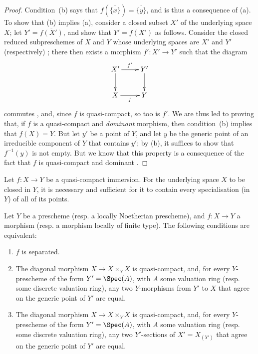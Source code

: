 \begin{proof}
Condition~(b) says that $f(\overline{\{x\}})=\overline{\{y\}}$, and is thus a consequence of (a).
To show that (b) implies (a), consider a closed subset $X'$ of the underlying space $X$;
let $Y'=\overline{f(X')}$, and show that $Y'=f(X')$ as follows.
Consider the closed reduced subpreschemes of $X$ and $Y$ whose underlying spaces are $X'$ and $Y'$ (respectively) ;
there then exists a morphism $f':X'\to Y'$ such that the diagram
\[
    \xymatrix{
        X' \ar[r]^{f'} \ar[d]
        & Y' \ar[d]
    \\  X \ar[r]_{f}
        & Y
    }
\]
commutes , and, since $f$ is quasi-compact, so too is $f'$.
We are thus led to proving that, if $f$ is a quasi-compact and \emph{dominant} morphism, then
condition~(b) implies that $f(X)=Y$.
But let $y'$ be a point of $Y$, and let $y$ be the generic point of an irreducible component of $Y$ that contains $y'$;
by (b), it suffices to show that $f^{-1}(y)$ is not empty.
But we know that this property is a consequence of the fact that $f$ is quasi-compact and dominant .
\end{proof}

\begin{corollary}[7.2.2]
\label{II.7.2.2}
Let $f:X\to Y$ be a quasi-compact immersion.
For the underlying space $X$ to be closed in $Y$, it is necessary and sufficient for it to contain every specialisation (in $Y$) of all of its points.
\end{corollary}

\begin{proposition}[7.2.3]
\label{II.7.2.3}
Let $Y$ be a prescheme (resp. a locally Noetherian prescheme), and $f:X\to Y$ a morphism (resp. a morphism locally of finite type).
The following conditions are equivalent:
\begin{enumerate}
    \item[\rm{(a)}] $f$ is separated.
    \item[\rm{(b)}] The diagonal morphism $X\to X\times_Y X$ is quasi-compact, and, for every $Y$-prescheme of the form $Y'=\Spec(A)$, with $A$ some valuation ring (resp. some discrete valuation ring), any two $Y$-morphisms from $Y'$ to $X$ that agree on the generic point of $Y'$ are equal.
    \item[\rm{(c)}] The diagonal morphism $X\to X\times_Y X$ is quasi-compact, and, for every $Y$-prescheme of the form $Y'=\Spec(A)$, with $A$ some valuation ring (resp. some discrete valuation ring), any two $Y'$-sections of $X'=X_{(Y')}$ that agree on the generic point of $Y'$ are equal.
\end{enumerate}
\end{proposition}

